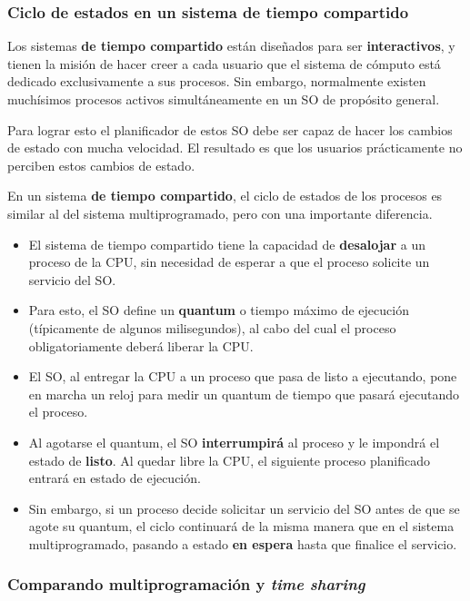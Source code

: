 \documentclass[spanish,A4,]{article}
\begin{document}
\subsubsection{Ciclo de estados en un sistema de tiempo
compartido}\label{ciclo-de-estados-en-un-sistema-de-tiempo-compartido}

Los sistemas \textbf{de tiempo compartido} están diseñados para ser
\textbf{interactivos}, y tienen la misión de hacer creer a cada usuario
que el sistema de cómputo está dedicado exclusivamente a sus procesos.
Sin embargo, normalmente existen muchísimos procesos activos
simultáneamente en un SO de propósito general.

Para lograr esto el planificador de estos SO debe ser capaz de hacer los
cambios de estado con mucha velocidad. El resultado es que los usuarios
prácticamente no perciben estos cambios de estado.

En un sistema \textbf{de tiempo compartido}, el ciclo de estados de los
procesos es similar al del sistema multiprogramado, pero con una
importante diferencia.

\begin{itemize}
\itemsep1pt\parskip0pt
\item
  El sistema de tiempo compartido tiene la capacidad de
  \textbf{desalojar} a un proceso de la CPU, sin necesidad de esperar a
  que el proceso solicite un servicio del SO.
\item
  Para esto, el SO define un \textbf{quantum} o tiempo máximo de
  ejecución (típicamente de algunos milisegundos), al cabo del cual el
  proceso obligatoriamente deberá liberar la CPU.
\item
  El SO, al entregar la CPU a un proceso que pasa de listo a ejecutando,
  pone en marcha un reloj para medir un quantum de tiempo que pasará
  ejecutando el proceso.
\item
  Al agotarse el quantum, el SO \textbf{interrumpirá} al proceso y le
  impondrá el estado de \textbf{listo}. Al quedar libre la CPU, el
  siguiente proceso planificado entrará en estado de ejecución.
\item
  Sin embargo, si un proceso decide solicitar un servicio del SO antes
  de que se agote su quantum, el ciclo continuará de la misma manera que
  en el sistema multiprogramado, pasando a estado \textbf{en espera}
  hasta que finalice el servicio.
\end{itemize}

\subsubsection{Comparando multiprogramación y \emph{time
sharing}}\label{comparando-multiprogramaciuxf3n-y-time-sharing}
\end{document}
